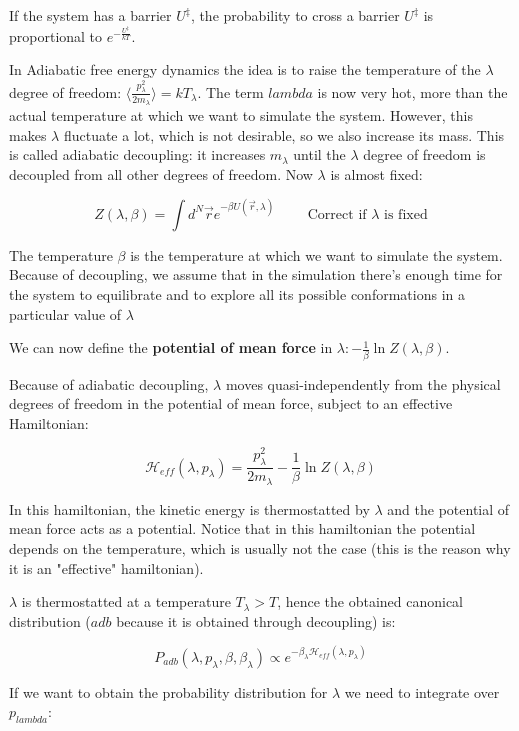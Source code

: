 	If the system has a barrier $U^{\ddagger}$, the probability to cross a barrier $U^{\ddagger}$ is proportional to $e^{-\frac{U^{\ddagger}}{kT}}$.
	
	In Adiabatic free energy dynamics the idea is to raise the temperature of the $\lambda$ degree of freedom: $\biggl\langle\frac{p_\lambda^2}{2m_\lambda}\biggr\rangle = kT_\lambda$.
	The term $lambda$ is now very hot, more than the actual temperature at which we want to simulate the system.
	However, this makes $\lambda$ fluctuate a lot, which is not desirable, so we also increase its mass.
	This is called adiabatic decoupling: it increases $m_\lambda$ until the $\lambda$ degree of freedom is decoupled from all other degrees of freedom. 
	Now $\lambda$ is almost fixed:

	$$Z(\lambda, \beta) = \int d^N\vec{r}e^{-\beta U(\vec{r}, \lambda)}\qquad\text{ Correct if }\lambda\text{ is fixed}$$
	
	The temperature $\beta$ is the temperature at which we want to simulate the system.
	Because of decoupling, we assume that in the simulation there's enough time for the system to equilibrate and to explore all its possible conformations in a particular value of $\lambda$

	We can now define the\textbf{ potential of mean force} in $\lambda:-\frac{1}{\beta}\ln Z(\lambda, \beta)$.
	
	Because of adiabatic decoupling, $\lambda$ moves quasi-independently from the physical degrees of freedom in the potential of mean force, subject to an effective Hamiltonian:

	$$\mathcal{H}_{eff}(\lambda, p_\lambda) = \frac{p_\lambda^2}{2m_\lambda} -\frac{1}{\beta}\ln Z(\lambda, \beta)$$ 
	
	In this hamiltonian, the kinetic energy is thermostatted by $\lambda$ and the potential of mean force acts as a potential. 
	Notice that in this hamiltonian the potential depends on the temperature, which is usually not the case (this is the reason why it is an "effective" hamiltonian). 
	

	$\lambda$ is thermostatted at a temperature $T_\lambda>T$, hence the obtained canonical distribution ($adb$ because it is obtained through decoupling) is:

	$$P_{adb}(\lambda, p_\lambda, \beta, \beta_\lambda)\propto e^{-\beta_\lambda\mathcal{H}_{eff}(\lambda, p_\lambda)}$$
	
	If we want to obtain the probability distribution for $\lambda$ we need to integrate over $p_{lambda}$:

